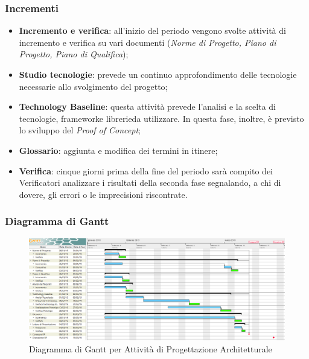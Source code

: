 \subsubsection{Incrementi}
\begin{itemize}
	\item \textbf{Incremento e verifica}: all'inizio del periodo vengono svolte attività di incremento e verifica su vari documenti (\textit{Norme di Progetto, Piano di Progetto, Piano di Qualifica});
	\item \textbf{Studio tecnologie}: prevede un continuo approfondimento delle tecnologie necessarie allo svolgimento del progetto; 
	\item \textbf{Technology Baseline}\glossario: questa attività prevede l'analisi e la scelta di tecnologie, framework\glossario e librerie\glossario da utilizzare. In questa fase, inoltre, è previsto lo sviluppo del \textit{Proof of Concept}\glossario;
	\item \textbf{Glossario}: aggiunta e modifica dei termini in itinere;  
	\item \textbf{Verifica}: cinque giorni prima della fine del periodo sarà compito dei Verificatori analizzare i risultati della seconda fase segnalando, a chi di dovere, gli errori o le imprecisioni riscontrate.
\end{itemize}

\begin{landscape}
\subsubsection{Diagramma di Gantt}
\begin{figure}[h]
	\centering
  		\includegraphics[width=1.0\linewidth]{./images/ProgettazioneArchitetturale.png}
  		\caption{Diagramma di Gantt per Attività di Progettazione Architetturale}
  		\label{fig:Gantt Progettazione Architetturale}
\end{figure}
\end{landscape}

